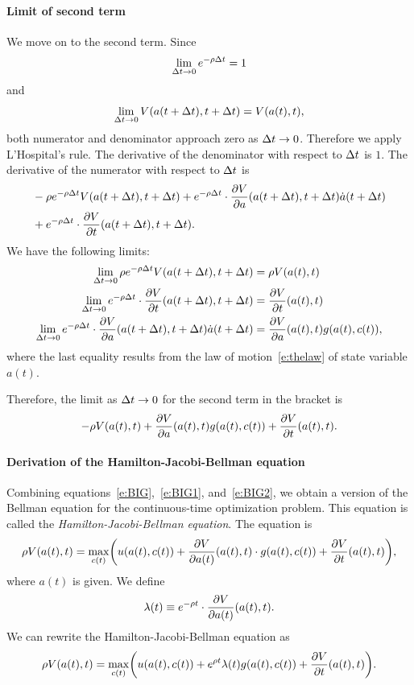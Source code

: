 \documentclass[letterpaper, 11pt, leqno]{article}
\begin{document}
\paragraph{Limit of second term} We move on to the second term. Since 
\begin{equation*}
\lim_{\Delta t\to 0} e^{-\rho \Delta t}=1
\end{equation*}
and 
\begin{equation*}
\lim_{\Delta t\to 0} V(a(t+\Delta t),t+\Delta t) =V(a(t),t), 
\end{equation*}
both numerator and denominator approach zero as $\Delta t\to 0$. Therefore we apply L'Hospital's rule. The derivative of the denominator with respect to $\Delta t$ is $1$. The derivative of the numerator with respect to $\Delta t$ is
\begin{align*}
&-\r e^{-\r \D t} V(a(t+\D t),t+\D t) + e^{-\r \D t}\cdot \pd{V}{a}(a(t+\D t),t+\D t) \dot{a}(t+\D t)\\
&+e^{-\r \D t}\cdot \pd{V}{t}(a(t+\D t),t+\D t). 
\end{align*}
We have the following limits:
\begin{align*}
\lim_{\D t\to 0} \r e^{-\r \D t}V(a(t+\D t), t+\D t) &=\r V(a(t),t)\\
\lim_{\D t\to 0} e^{-\r \D t}\cdot \pd{V}{t}(a(t+\D t),t+\D t) &= \pd{V}{t}(a(t),t)\\
\lim_{\D t\to 0} e^{-\r \D t}\cdot \pd{V}{a}(a(t+\D t),t+\D t) \dot{a}(t+\D t)&=\pd{V}{a}(a(t),t) g(a(t),c(t)),
\end{align*}
where the last equality results from the law of motion~\eqref{e:thelaw} of state variable $a(t)$.

Therefore, the limit as $\Delta t\to 0$ for the second term in the bracket is 
\begin{equation}
-\r V(a(t),t)+\pd{V}{a}(a(t),t)  g(a(t),c(t))+\pd{V}{t}(a(t),t).\label{e:BIG2}
\end{equation}

\paragraph{Derivation of the Hamilton-Jacobi-Bellman equation} Combining equations~\eqref{e:BIG},~\eqref{e:BIG1}, and~\eqref{e:BIG2}, we obtain a version of the Bellman equation for the continuous-time optimization problem. This equation is called the \textit{Hamilton-Jacobi-Bellman equation}. The equation is
\begin{equation}
\r V(a(t),t) =\max[c(t)]{u(a(t),c(t)) +\pd{V}{a(t)}(a(t),t)\cdot
g(a(t),c(t)) +\pd{V}{t}(a(t),t)}, \label{e:HJB}
\end{equation}
where $a(t)$ is given. We define 
\begin{equation*}
\l(t)\equiv e^{-\r t}\cdot \pd{V}{a(t)}(a(t),t).
\end{equation*}
We can rewrite the Hamilton-Jacobi-Bellman equation as
\begin{equation}
\r V(a(t),t) =\max[c(t)]{u(a(t),c(t)) +e^{\r t} \l(t)
g(a(t),c(t)) +\pd{V}{t}(a(t),t)}.
\label{e:HJB2}\end{equation}
\end{document}
